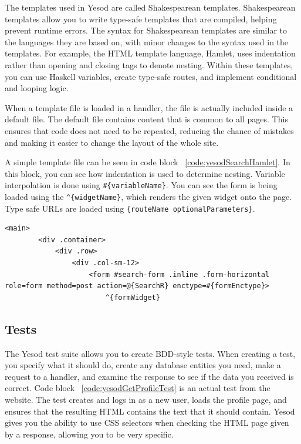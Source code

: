 The templates used in Yesod are called Shakespearean templates. Shakespearean templates
allow you to write type-safe templates that are compiled, helping prevent runtime errors.
The syntax for Shakespearean templates are similar to the languages they are based on,
with minor changes to the syntax used in the templates. For example, the HTML template language, Hamlet,
uses indentation rather than opening and closing tags to denote nesting. Within these
templates, you can use Haskell variables, create type-safe routes, and implement conditional
and looping logic. \parencite[Shakespearean Templates]{yesodBook}

When a template file is loaded in a handler, the file is actually included inside
a default file. The default file contains content that is common to all pages. This
ensures that code does not need to be repeated, reducing the chance of mistakes and
making it easier to change the layout of the whole site.

A simple template file can be seen in code block ~\ref{code:yesodSearchHamlet}. In this
block, you can see how indentation is used to determine nesting. Variable interpolation
is done using \texttt{\#\{variableName\}}. You can see the form is being loaded using
the \texttt{\string^\{widgetName\}}, which renders the given widget onto the page. Type safe
URLs are loaded using \texttt{\string@\{routeName optionalParameters\}}.

\begin{lstlisting}[caption={Template file for the search page},label={code:yesodSearchHamlet}]
    <main>
        <div .container>
            <div .row>
                <div .col-sm-12>
                    <form #search-form .inline .form-horizontal role=form method=post action=@{SearchR} enctype=#{formEnctype}>
                        ^{formWidget}

\end{lstlisting}

\subsection{Tests}
The Yesod test suite allows you to create BDD-style tests. When creating a test,
you specify what it should do, create any database entities you need, make a
request to a handler, and examine the response to see if the data you received
is correct. Code block ~\ref{code:yesodGetProfileTest} is an actual test
from the website. The test creates and logs in as a new user, loads
the profile page, and ensures that the resulting HTML contains the text that
it should contain. Yesod gives you the ability to use CSS selectors when checking
the HTML page given by a response, allowing you to be very specific.

